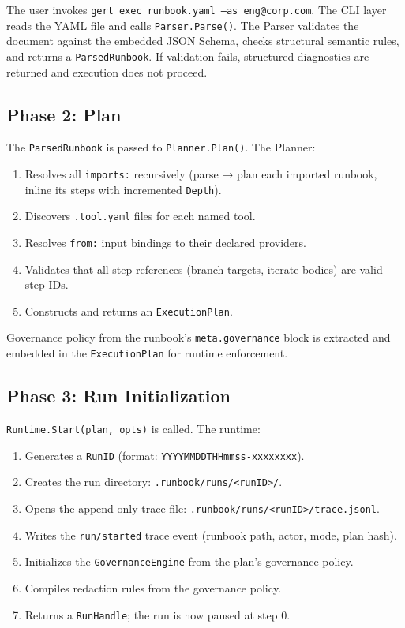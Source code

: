 The user invokes \texttt{gert exec runbook.yaml --as eng@corp.com}. The CLI layer reads the
YAML file and calls \texttt{Parser.Parse()}. The Parser validates the document against the
embedded JSON Schema, checks structural semantic rules, and returns a \texttt{ParsedRunbook}.
If validation fails, structured diagnostics are returned and execution does not proceed.

\subsection{Phase 2: Plan}

The \texttt{ParsedRunbook} is passed to \texttt{Planner.Plan()}. The Planner:
\begin{enumerate}
  \item Resolves all \texttt{imports:} recursively (parse → plan each imported runbook, inline
        its steps with incremented \texttt{Depth}).
  \item Discovers \texttt{.tool.yaml} files for each named tool.
  \item Resolves \texttt{from:} input bindings to their declared providers.
  \item Validates that all step references (branch targets, iterate bodies) are valid step IDs.
  \item Constructs and returns an \texttt{ExecutionPlan}.
\end{enumerate}

Governance policy from the runbook's \texttt{meta.governance} block is extracted and embedded
in the \texttt{ExecutionPlan} for runtime enforcement.

\subsection{Phase 3: Run Initialization}

\texttt{Runtime.Start(plan, opts)} is called. The runtime:
\begin{enumerate}
  \item Generates a \texttt{RunID} (format: \texttt{YYYYMMDDTHHmmss-xxxxxxxx}).
  \item Creates the run directory: \texttt{.runbook/runs/<runID>/}.
  \item Opens the append-only trace file: \texttt{.runbook/runs/<runID>/trace.jsonl}.
  \item Writes the \texttt{run/started} trace event (runbook path, actor, mode, plan hash).
  \item Initializes the \texttt{GovernanceEngine} from the plan's governance policy.
  \item Compiles redaction rules from the governance policy.
  \item Returns a \texttt{RunHandle}; the run is now paused at step 0.
\end{enumerate}

